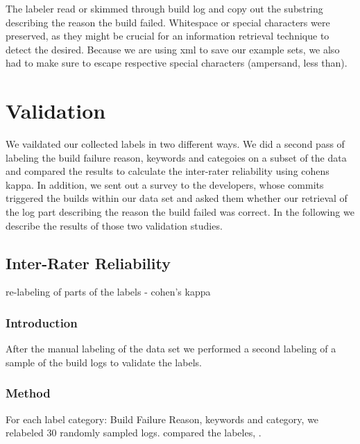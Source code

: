 \documentclass[\myrootdir/main.tex]{subfiles}
\begin{document}
The labeler read or skimmed through build log and copy out the substring describing the reason the build failed.
Whitespace or special characters were preserved, as they might be crucial for an information retrieval technique to detect the desired.
Because we are using xml to save our example sets, we also had to make sure to escape respective special characters (ampersand, less than).


\section{Validation}
We vaildated our collected labels in two different ways. We did a second pass of labeling the build failure reason, keywords and categoies on a subset of the data and compared the results to calculate the inter-rater reliability using cohens kappa. In addition, we sent out a survey to the developers, whose commits triggered the builds within our data set and asked them whether our retrieval of the log part describing the reason the build failed was correct. In the following we describe the results of those two validation studies.

\subsection{Inter-Rater Reliability}
re-labeling of parts of the labels - cohen's kappa
\subsubsection{Introduction}
After the manual labeling of the data set we performed a second labeling of a sample of the build logs to validate the labels.
\subsubsection{Method}
For each label category: Build Failure Reason, keywords and category, we relabeled 30 randomly sampled logs.
compared the labeles, .
\end{document}
